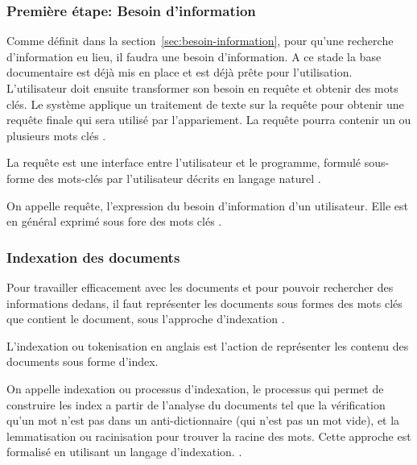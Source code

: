 \subsubsection{Première étape: Besoin d'information}
Comme définit dans la section~\ref{sec:besoin-information}, pour qu'une recherche d'information eu lieu, il faudra une besoin d'information. A ce stade la base documentaire est déjà mis en place et est déjà prête pour l'utilisation. L'utilisateur doit ensuite transformer son besoin en requête et obtenir des mots clés. Le système applique un traitement de texte sur la requête pour obtenir une requête finale qui sera utilisé par l'appariement. La requête pourra contenir un ou plusieurs mots clés \citep{modern-ir}.

\begin{definition}
    La requête est une interface entre l'utilisateur et le programme, formulé sous-forme des mots-clés par l'utilisateur décrits en langage naturel \citep{amelioration-ri-approche-semantique}.
\end{definition}

\begin{definition}
    On appelle requête, l'expression du besoin d'information d'un utilisateur. Elle est en général exprimé sous fore des mots clés \citep{salton1989automatique}.
\end{definition}

\subsubsection{Indexation des documents}
Pour travailler efficacement avec les documents et pour pouvoir rechercher des informations dedans, il faut représenter les documents sous formes des mots clés que contient le document, sous l'approche d'indexation \citep{ir-on-web}.

\begin{definition}
    L'indexation ou tokenisation en anglais est l'action de représenter les contenu des documents sous forme d'index.
\end{definition}

\begin{definition}
    On appelle indexation ou processus d'indexation, le processus qui permet de construire les index a partir de l'analyse du documents tel que la vérification qu'un mot n'est pas dans un anti-dictionnaire (qui n'est pas un mot vide), et la lemmatisation ou racinisation pour trouver la racine des mots. Cette approche est formalisé en utilisant un langage d'indexation. \citep{paradis:tel-00005009}.
\end{definition}

